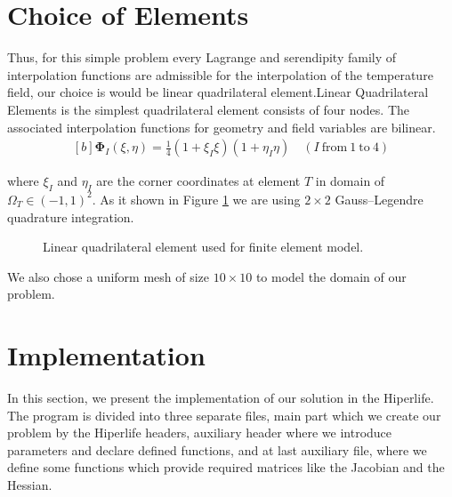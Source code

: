 \documentclass[]{article}
\begin{document}
\section{Choice of Elements} \label{sec: coe}
Thus, for this simple problem every Lagrange and serendipity family of interpolation functions are admissible for the interpolation of the temperature field, our choice is would be linear quadrilateral element.Linear  Quadrilateral Elements is the simplest quadrilateral element consists of four nodes. The associated interpolation functions for geometry and ﬁeld variables are bilinear.
\begin{equation}\label{eq11}
	\begin{aligned}[b]
		\boldsymbol{\Phi}_{I}(\xi, \eta) = \frac{1}{4}(1+\xi_I\xi)(1+\eta_I\eta) \quad (I \ \text{from} \ 1 \ \text{to} \ 4)
	\end{aligned}
\end{equation}

where $\xi_{I}$ and $\eta_{I}$ are the corner coordinates at element $T$ in domain of $\Omega_{T} \in (-1,1)^2$. As it shown in Figure \ref{fig_el} we are using $2 \times 2$ Gauss–Legendre quadrature integration.
\begin{figure}[htbp]
	\centering
	
	\caption{Linear quadrilateral element used for finite element model.}
	\label{fig_el}
\end{figure}
We also chose a uniform mesh of size $10 \times 10$ to model the domain of our problem.
\section{Implementation} \label{sec: imp}
In this section, we present the implementation of our solution in the Hiperlife. The program is divided into three separate files, main part which we create our problem by the Hiperlife headers, auxiliary header where we introduce parameters and declare defined functions, and at last auxiliary file, where we define some functions which provide required matrices like the Jacobian and the Hessian.
\end{document}
